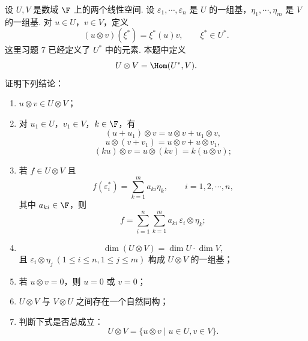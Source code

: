 \begin{problem}\label{习题18}
	设 $U,V$ 是数域 $\F$ 上的两个线性空间. 设 $\varepsilon_1,\cdots,\varepsilon_n$ 是 $U$ 的一组基，$\eta_1,\cdots,\eta_m$ 是 $V$ 的一组基. 对 $u\in U$，$v\in V$，定义
	\[
	(u\otimes v)(\xi^*)=\xi^*(u)v,
	\qquad \xi^*\in U^*.
	\]
	这里习题 7 已经定义了 $U^*$ 中的元素. 本题中定义
	\[
	U\otimes V=\Hom(U^*,V).
	\]
	证明下列结论：
	\begin{enumerate}
		\item $u\otimes v\in U\otimes V$；
		\item 对 $u_1\in U$，$v_1\in V$，$k\in\F$，有
		\[
		(u+u_1)\otimes v=u\otimes v+u_1\otimes v,
		\]
		\[
		u\otimes(v+v_1)=u\otimes v+u\otimes v_1,
		\]
		\[
		(ku)\otimes v=u\otimes(kv)=k(u\otimes v);
		\]
		\item 若 $f\in U\otimes V$ 且
		\[
		f(\varepsilon_i^*)=\sum_{k=1}^m a_{ki}\eta_k,
		\qquad i=1,2,\cdots,n,
		\]
		其中 $a_{ki}\in\F$，则
		\[
		f=\sum_{i=1}^n\sum_{k=1}^m a_{ki}\,\varepsilon_i\otimes\eta_k;
		\]
		\item 
		\[
		\dim(U\otimes V)=\dim U\cdot\dim V,
		\]
		且 $\varepsilon_i\otimes\eta_j\ (1\le i\le n,1\le j\le m)$ 构成 $U\otimes V$ 的一组基；
		\item 若 $u\otimes v=0$，则 $u=0$ 或 $v=0$；
		\item $U\otimes V$ 与 $V\otimes U$ 之间存在一个自然同构；
		\item 判断下式是否总成立：
		\[
		U\otimes V=\{u\otimes v\mid u\in U,
		v\in V\}.
		\]
	\end{enumerate}
\end{problem}

